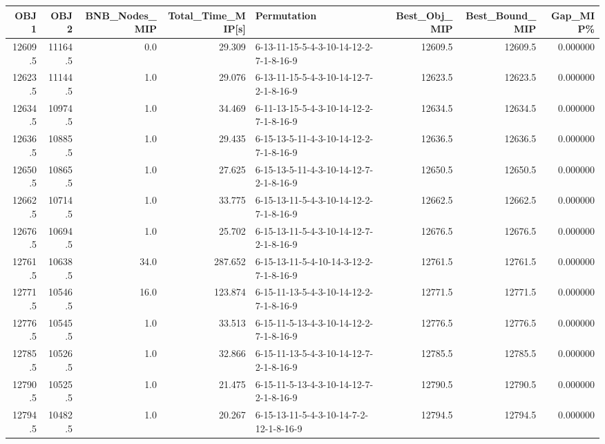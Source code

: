 \begin{tabular}{rrrrlrrr}
\toprule
    OBJ1 &     OBJ2 &  BNB\_Nodes\_MIP &  Total\_Time\_MIP[s] &                             Permutation &  Best\_Obj\_MIP &  Best\_Bound\_MIP &  Gap\_MIP\% \\
\midrule
 12609.5 &  11164.5 &            0.0 &             29.309 &  6-13-11-15-5-4-3-10-14-12-2-7-1-8-16-9 &       12609.5 &         12609.5 &  0.000000 \\
 12623.5 &  11144.5 &            1.0 &             29.076 &  6-13-11-15-5-4-3-10-14-12-7-2-1-8-16-9 &       12623.5 &         12623.5 &  0.000000 \\
 12634.5 &  10974.5 &            1.0 &             34.469 &  6-11-13-15-5-4-3-10-14-12-2-7-1-8-16-9 &       12634.5 &         12634.5 &  0.000000 \\
 12636.5 &  10885.5 &            1.0 &             29.435 &  6-15-13-5-11-4-3-10-14-12-2-7-1-8-16-9 &       12636.5 &         12636.5 &  0.000000 \\
 12650.5 &  10865.5 &            1.0 &             27.625 &  6-15-13-5-11-4-3-10-14-12-7-2-1-8-16-9 &       12650.5 &         12650.5 &  0.000000 \\
 12662.5 &  10714.5 &            1.0 &             33.775 &  6-15-13-11-5-4-3-10-14-12-2-7-1-8-16-9 &       12662.5 &         12662.5 &  0.000000 \\
 12676.5 &  10694.5 &            1.0 &             25.702 &  6-15-13-11-5-4-3-10-14-12-7-2-1-8-16-9 &       12676.5 &         12676.5 &  0.000000 \\
 12761.5 &  10638.5 &           34.0 &            287.652 &  6-15-13-11-5-4-10-14-3-12-2-7-1-8-16-9 &       12761.5 &         12761.5 &  0.000000 \\
 12771.5 &  10546.5 &           16.0 &            123.874 &  6-15-11-13-5-4-3-10-14-12-2-7-1-8-16-9 &       12771.5 &         12771.5 &  0.000000 \\
 12776.5 &  10545.5 &            1.0 &             33.513 &  6-15-11-5-13-4-3-10-14-12-2-7-1-8-16-9 &       12776.5 &         12776.5 &  0.000000 \\
 12785.5 &  10526.5 &            1.0 &             32.866 &  6-15-11-13-5-4-3-10-14-12-7-2-1-8-16-9 &       12785.5 &         12785.5 &  0.000000 \\
 12790.5 &  10525.5 &            1.0 &             21.475 &  6-15-11-5-13-4-3-10-14-12-7-2-1-8-16-9 &       12790.5 &         12790.5 &  0.000000 \\
 12794.5 &  10482.5 &            1.0 &             20.267 &  6-15-13-11-5-4-3-10-14-7-2-12-1-8-16-9 &       12794.5 &         12794.5 &  0.000000 \\

\end{tabular}
